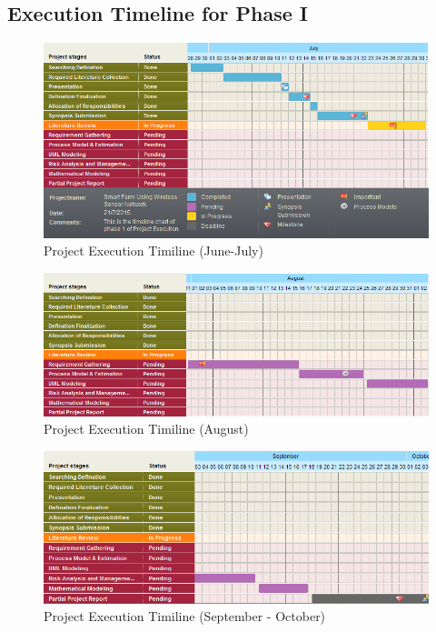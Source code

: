 \documentclass[10pt,a4paper]{article}
\begin{document}
\subsection{Execution Timeline for Phase I}
\begin{figure}[hbtp]
\centering
\includegraphics[scale=0.760]{1.png}
\caption{Project Execution Timiline (June-July) }
\end{figure}
\begin{figure}[hbtp]
\centering
\includegraphics[scale=0.760]{2.png}
\caption{Project Execution Timiline (August) }
\end{figure}
\begin{figure}[hbtp]
\centering
\includegraphics[scale=0.760]{3.png}
\caption{Project Execution Timiline (September - October) }
\end{figure}

\newpage %
\end{document}
